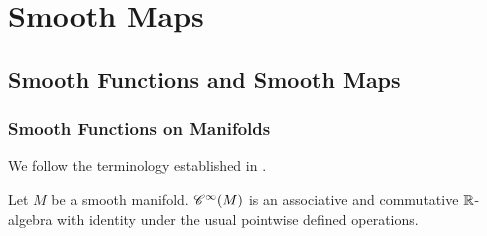 \chapter{Smooth Maps}
\section{Smooth Functions and Smooth Maps}
\subsection{Smooth Functions on Manifolds}

We follow the terminology established in \cite[515]{grillet:abstract_algebra:2007}.

\begin{exercise}
	Let $M$ be a smooth manifold. $\mathscr{C}^\infty(M)$ is an associative and commutative $\mathbb{R}$-algebra with identity under the usual pointwise defined operations.
\end{exercise}

